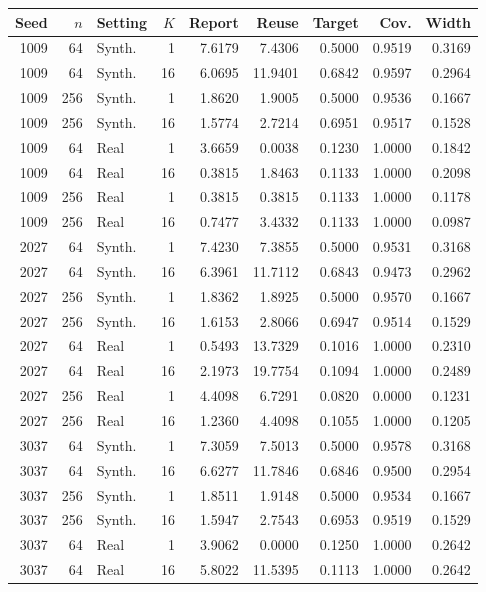 \begin{longtable}{rrlrrrrrr}\toprule
Seed & $n$ & Setting & $K$ & Report & Reuse & Target & Cov. & Width\\\midrule\endhead
1009 & 64 & Synth. & 1 & 7.6179 & 7.4306 & 0.5000 & 0.9519 & 0.3169\\
1009 & 64 & Synth. & 16 & 6.0695 & 11.9401 & 0.6842 & 0.9597 & 0.2964\\
1009 & 256 & Synth. & 1 & 1.8620 & 1.9005 & 0.5000 & 0.9536 & 0.1667\\
1009 & 256 & Synth. & 16 & 1.5774 & 2.7214 & 0.6951 & 0.9517 & 0.1528\\
1009 & 64 & Real & 1 & 3.6659 & 0.0038 & 0.1230 & 1.0000 & 0.1842\\
1009 & 64 & Real & 16 & 0.3815 & 1.8463 & 0.1133 & 1.0000 & 0.2098\\
1009 & 256 & Real & 1 & 0.3815 & 0.3815 & 0.1133 & 1.0000 & 0.1178\\
1009 & 256 & Real & 16 & 0.7477 & 3.4332 & 0.1133 & 1.0000 & 0.0987\\
2027 & 64 & Synth. & 1 & 7.4230 & 7.3855 & 0.5000 & 0.9531 & 0.3168\\
2027 & 64 & Synth. & 16 & 6.3961 & 11.7112 & 0.6843 & 0.9473 & 0.2962\\
2027 & 256 & Synth. & 1 & 1.8362 & 1.8925 & 0.5000 & 0.9570 & 0.1667\\
2027 & 256 & Synth. & 16 & 1.6153 & 2.8066 & 0.6947 & 0.9514 & 0.1529\\
2027 & 64 & Real & 1 & 0.5493 & 13.7329 & 0.1016 & 1.0000 & 0.2310\\
2027 & 64 & Real & 16 & 2.1973 & 19.7754 & 0.1094 & 1.0000 & 0.2489\\
2027 & 256 & Real & 1 & 4.4098 & 6.7291 & 0.0820 & 0.0000 & 0.1231\\
2027 & 256 & Real & 16 & 1.2360 & 4.4098 & 0.1055 & 1.0000 & 0.1205\\
3037 & 64 & Synth. & 1 & 7.3059 & 7.5013 & 0.5000 & 0.9578 & 0.3168\\
3037 & 64 & Synth. & 16 & 6.6277 & 11.7846 & 0.6846 & 0.9500 & 0.2954\\
3037 & 256 & Synth. & 1 & 1.8511 & 1.9148 & 0.5000 & 0.9534 & 0.1667\\
3037 & 256 & Synth. & 16 & 1.5947 & 2.7543 & 0.6953 & 0.9519 & 0.1529\\
3037 & 64 & Real & 1 & 3.9062 & 0.0000 & 0.1250 & 1.0000 & 0.2642\\
3037 & 64 & Real & 16 & 5.8022 & 11.5395 & 0.1113 & 1.0000 & 0.2642\\

\end{longtable}
